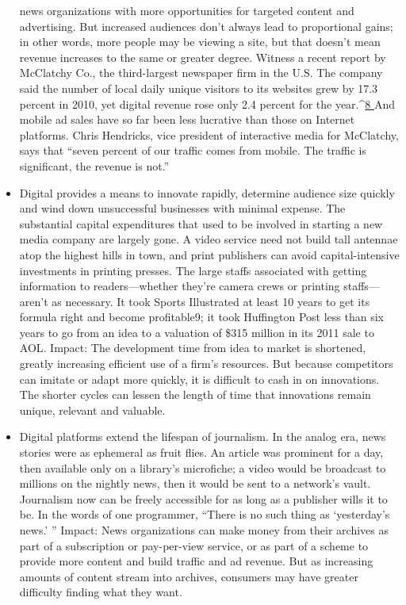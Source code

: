\begin{itemize}
news organizations with more opportunities for targeted content and
advertising. But increased audiences don’t always lead to proportional gains;
in other words, more people may be viewing a site, but that doesn’t mean
revenue increases to the same or greater degree. Witness a recent report by
McClatchy Co., the third-largest newspaper firm in the U.S. The company
said the number of local daily unique visitors to its websites grew by 17.3
percent in 2010, yet digital revenue rose only 2.4 percent for the year.^{\href{#endnotes-ch1}{8 }}And mobile ad sales have so far been less lucrative than those on Internet platforms.
Chris Hendricks, vice president of interactive media for McClatchy,
says that ``seven percent of our traffic comes from mobile. The traffic is significant,
the revenue is not.''
\item Digital provides a means to innovate rapidly, determine audience size
quickly and wind down unsuccessful businesses with minimal expense.
The substantial capital expenditures that used to be involved in
starting a new media company are largely gone. A video service need not
build tall antennae atop the highest hills in town, and print publishers can
avoid capital-intensive investments in printing presses. The large staffs associated
with getting information to readers—whether they’re camera crews
or printing staffs—aren’t as necessary. It took Sports Illustrated at least 10
years to get its formula right and become profitable9; it took Huffington
Post less than six years to go from an idea to a valuation of \$315 million in
its 2011 sale to AOL.
Impact: The development time from idea to market is shortened, greatly
increasing efficient use of a firm’s resources. But because competitors can
imitate or adapt more quickly, it is difficult to cash in on innovations. The
shorter cycles can lessen the length of time that innovations remain unique,
relevant and valuable.
\item Digital platforms extend the lifespan of journalism. In the analog era, news
stories were as ephemeral as fruit flies. An article was prominent for a day, then
available only on a library’s microfiche; a video would be broadcast to millions
on the nightly news, then it would be sent to a network’s vault. Journalism
now can be freely accessible for as long as a publisher wills it to be. In the words
of one programmer, ``There is no such thing as ‘yesterday’s news.’ ''
Impact: News organizations can make money from their archives as part
of a subscription or pay-per-view service, or as part of a scheme to provide
more content and build traffic and ad revenue. But as increasing amounts of
content stream into archives, consumers may have greater difficulty finding
what they want.
\end{itemize}
